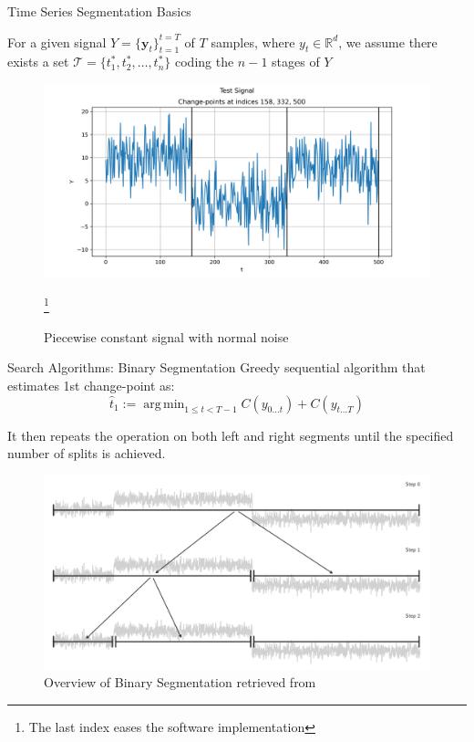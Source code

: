 \documentclass{beamer}
\DeclareMathOperator*{\argmin}{arg\,min}
\begin{document}
        \begin{frame}{Time Series Segmentation Basics}

            For a given signal $Y = \{\boldsymbol{y}_t\}_{t=1}^{t=T}$ of $T$ samples, where $y_t \in \mathbb{R}^d$, we assume there exists a set $\mathcal{T} = \{t_{1}^{*}, t_{2}^{*}, \dots, t_{n}^{*}\}$ coding the $n-1$ stages of $Y$

            \begin{figure}[!htbp]
                \centering
                \includegraphics[scale=0.4]{show_series.png}
                \caption{Piecewise constant signal with normal noise}
                \footnote{The last index eases the software implementation}
            \end{figure}

        \end{frame}

        \begin{frame}{Search Algorithms: Binary Segmentation}
            Greedy sequential algorithm that estimates 1st change-point as:
            \begin{equation}
                \hat{t}_{1} := \argmin_{1 \leq t < T - 1} C(y_{0 \dots t}) + C(y_{t \dots T})
            \end{equation}

            It then repeats the operation on both left and right segments until the specified number of splits is achieved.

            \begin{figure}[!htbp]
                \centering
                \includegraphics[scale=0.3]{bin_seg_schematics.png}
                \caption{Overview of Binary Segmentation retrieved from \cite{truong2020selective}}
            \end{figure}

        \end{frame}
\end{document}

